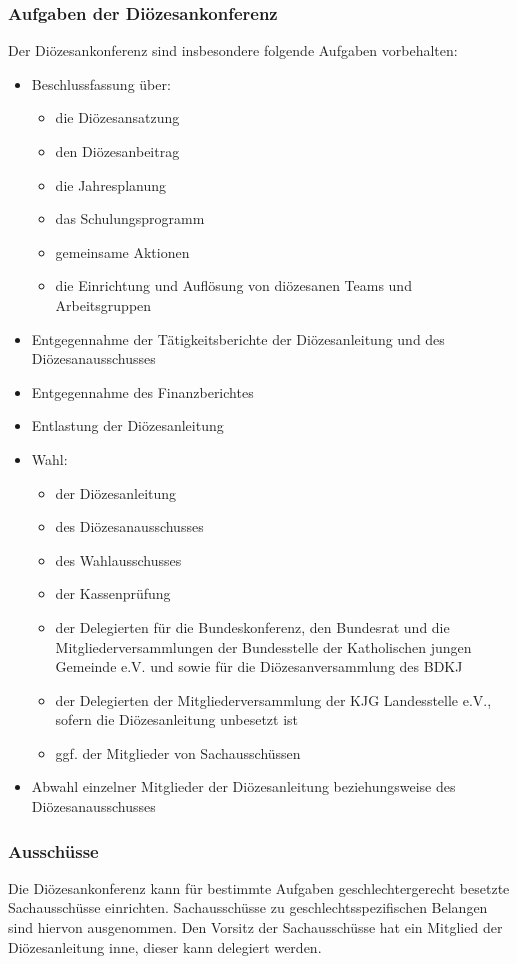 \documentclass[12pt]{report}
\begin{document}
\begin{flushleft}
\subsubsection{Aufgaben der Diözesankonferenz}
Der Diözesankonferenz sind insbesondere folgende Aufgaben vorbehalten:
\begin{itemize}	
  \item Beschlussfassung über:
    \begin{itemize} 
      \item die Diözesansatzung
      \item den Diözesanbeitrag
      \item die Jahresplanung
      \item das Schulungsprogramm
      \item gemeinsame Aktionen
      \item die Einrichtung und Auflösung von diözesanen Teams und Arbeitsgruppen
    \end{itemize}
  \item Entgegennahme der Tätigkeitsberichte der Diözesanleitung und des Diözesanausschusses
  \item Entgegennahme des Finanzberichtes
  \item Entlastung der Diözesanleitung
  \item Wahl:
    \begin{itemize}
      \item der Diözesanleitung
      \item des Diözesanausschusses
      \item des Wahlausschusses
      \item der Kassenprüfung
      \item der Delegierten für die Bundeskonferenz, den Bundesrat und die 
            Mitgliederversammlungen der Bundesstelle der Katholischen jungen Gemeinde e.V. und sowie für die
            Diözesanversammlung des BDKJ
      \item der Delegierten der Mitgliederversammlung der KJG Landesstelle e.V., sofern die Diözesanleitung
            unbesetzt ist
      \item ggf. der Mitglieder von Sachausschüssen
    \end{itemize}
  \item Abwahl einzelner Mitglieder der Diözesanleitung beziehungsweise des Diözesanausschusses
\end{itemize}
\subsubsection{Ausschüsse}
Die Diözesankonferenz kann für bestimmte Aufgaben {\color{red}geschlechtergerecht} besetzte Sachausschüsse einrichten.
Sachausschüsse zu geschlechtsspezifischen Belangen sind hiervon ausgenommen.
Den Vorsitz der Sachausschüsse hat ein Mitglied der Diözesanleitung inne, dieser kann delegiert
werden.


\end{flushleft}
\end{document}
